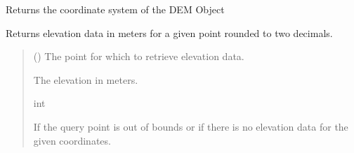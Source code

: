 \documentclass[letterpaper,10pt,english]{sphinxmanual}
\begin{document}
\begin{fulllineitems}

\begin{fulllineitems}
\label{\detokenize{pysewer:pysewer.preprocessing.DEM.get_crs}}
\pysigstartsignatures
{}
\pysigstopsignatures
\sphinxAtStartPar
Returns the coordinate system of the DEM Object

\end{fulllineitems}


\begin{fulllineitems}
\label{\detokenize{pysewer:id11}}
\pysigstartsignatures
{}
\pysigstopsignatures
\sphinxAtStartPar
Returns elevation data in meters for a given point rounded to two decimals.
\begin{quote}\begin{description}
\sphinxAtStartPar
{} () \textendash{} The point for which to retrieve elevation data.

\sphinxAtStartPar
The elevation in meters.

\sphinxAtStartPar
int

\sphinxAtStartPar
{} \textendash{} If the query point is out of bounds or if there is no elevation data for the given coordinates.

\end{description}\end{quote}

\end{fulllineitems}



\end{fulllineitems}
\end{document}
